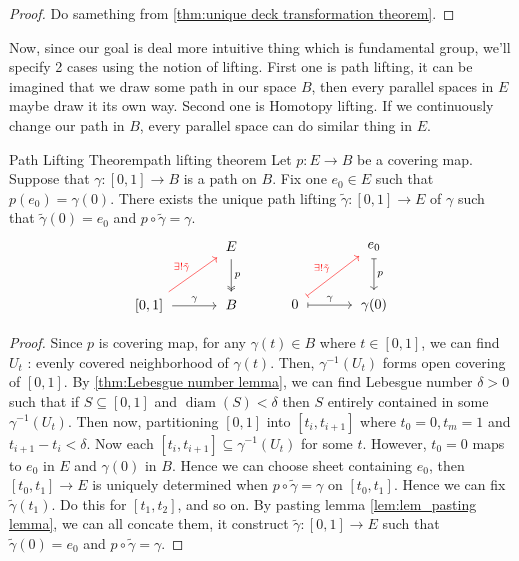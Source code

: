 \documentclass[12pt, a4paper, twoside]{article}
\theoremstyle{plain}
\begin{document}
\begin{proof}
    Do samething from \ref{thm:unique deck transformation theorem}. 
\end{proof}

Now, since our goal is deal more intuitive thing which is fundamental group, 
we'll specify 2 cases using the notion of lifting. 
First one is path lifting, it can be imagined that we draw some path in our space $B$, 
then every parallel spaces in $E$ maybe draw it its own way. Second one is Homotopy lifting. 
If we continuously change our path in $B$, every parallel space can do similar thing in $E$. 

\begin{thm}{Path Lifting Theorem}{path lifting theorem}
    Let $p: E \rightarrow B$ be a covering map. 
    Suppose that $\gamma: [0,1] \rightarrow B$ is a path on $B$. 
    Fix one $e_0 \in E$ such that $p(e_0) = \gamma(0)$. 
    There exists the unique path lifting $\tilde{\gamma}: [0,1] \rightarrow E$ of $\gamma$ 
    such that $\tilde{\gamma}(0) = e_0$ and $p \circ \tilde{\gamma} = \gamma$. 
    \[
    \begin{tikzcd}[row sep=large, column sep=large]
        & E \arrow[d, two heads, "p", shorten >= 2pt, shorten <= 2pt]\\
        \left[0,1\right] \arrow[r, "\gamma", shorten >= 2pt, shorten <= 2pt] \arrow[ru, "\exists! \tilde{\gamma}", red, shorten >= 2pt, shorten <= 2pt] & B
    \end{tikzcd}
    \quad \quad \quad
    \begin{tikzcd}[row sep=large, column sep=large]
        & e_0 \arrow[d, "p", mapsto, shorten >= 2pt, shorten <= 2pt]\\
        0 \arrow[r, "\gamma", mapsto, shorten >= 2pt, shorten <= 2pt] \arrow[ru, red, "\exists! \tilde{\gamma}", mapsto, shorten >= 2pt, shorten <= 2pt] & \gamma(0)
    \end{tikzcd}
    \]
\end{thm}

\begin{proof}
    Since $p$ is covering map, for any $\gamma(t) \in B$ where $t \in [0,1]$, we can find 
    $U_t$ : evenly covered neighborhood of $\gamma(t)$. 
    Then, $\gamma^{-1}(U_t)$ forms open covering of $[0,1]$. 
    By \ref{thm:Lebesgue number lemma}, we can find Lebesgue number $\delta > 0$ such that 
    if $S \subseteq [0,1]$ and $\operatorname{diam}(S) < \delta$ then $S$ entirely contained in 
    some $\gamma^{-1}(U_t)$. 
    Then now, partitioning $[0,1]$ into $[t_i, t_{i+1}]$ where $t_0 = 0, t_m = 1$ and $t_{i+1} - t_i < \delta$. 
    Now each $[t_i, t_{i+1}] \subseteq \gamma^{-1}(U_t)$ for some $t$. 
    However, $t_0 = 0$ maps to $e_0$ in $E$ and $\gamma(0)$ in $B$. Hence we can choose 
    sheet containing $e_0$, then $[t_0, t_1] \rightarrow E$ is uniquely determined when $p \circ \tilde{\gamma} = \gamma$ on $[t_0, t_1]$. 
    Hence we can fix $\tilde{\gamma}(t_1)$. Do this for $[t_1, t_2]$, and so on. 
    By pasting lemma \ref{lem:lem_pasting lemma}, we can all concate them, it construct $\tilde{\gamma}: [0,1] \rightarrow E$ such that $\tilde{\gamma}(0) = e_0$ and $p \circ \tilde{\gamma} = \gamma$. 
\end{proof}
\end{document}
